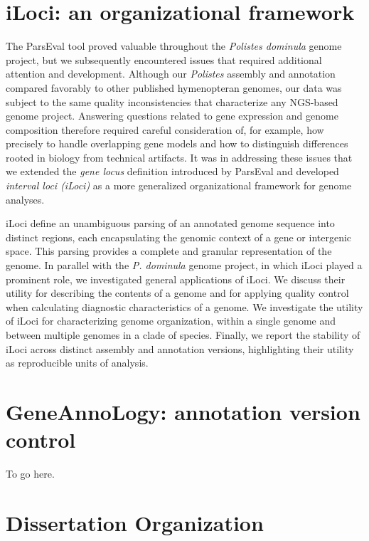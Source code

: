 \section{iLoci: an organizational framework}

The ParsEval tool proved valuable throughout the \textit{Polistes dominula} genome project, but we subsequently encountered issues that required additional attention and development.
Although our \textit{Polistes} assembly and annotation compared favorably to other published hymenopteran genomes, our data was subject to the same quality inconsistencies that characterize any NGS-based genome project.
Answering questions related to gene expression and genome composition therefore required careful consideration of, for example, how precisely to handle overlapping gene models and how to distinguish differences rooted in biology from technical artifacts.
It was in addressing these issues that we extended the \textit{gene locus} definition introduced by ParsEval and developed \textit{interval loci (iLoci)} as a more generalized organizational framework for genome analyses.

iLoci define an unambiguous parsing of an annotated genome sequence into distinct regions, each encapsulating the genomic context of a gene or intergenic space.
This parsing provides a complete and granular representation of the genome.
In parallel with the \textit{P. dominula} genome project, in which iLoci played a prominent role, we investigated general applications of iLoci.
We discuss their utility for describing the contents of a genome and for applying quality control when calculating diagnostic characteristics of a genome.
We investigate the utility of iLoci for characterizing genome organization, within a single genome and between multiple genomes in a clade of species.
Finally, we report the stability of iLoci across distinct assembly and annotation versions, highlighting their utility as reproducible units of analysis.

\section{GeneAnnoLogy: annotation version control}

To go here.

\section{Dissertation Organization}

